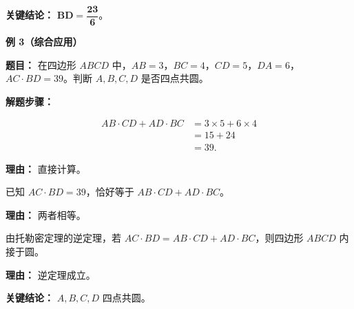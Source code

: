 \begin{examplebox}
	\textbf{\textcolor{CExample}{关键结论：}}
	$\mathbf{BD = \dfrac{23}{6}}$。

	\medskip
	\textbf{\textcolor{CExample}{例 3（综合应用）}}

	\textbf{\textcolor{CExample}{题目：}}
	在四边形 $ABCD$ 中，$AB=3$，$BC=4$，$CD=5$，$DA=6$，$AC\cdot BD = 39$。判断 $A,B,C,D$ 是否四点共圆。

	\textbf{\textcolor{CExample}{解题步骤：}}
	\begin{description}[style=nextline, leftmargin=2.8em, labelsep=0.5em, itemsep=0.45em]
		\item[\textbf{第一步（计算对边积和）：}]
			\[
				\begin{aligned}
					AB\cdot CD + AD\cdot BC &= 3\times5 + 6\times4 \\
					&= 15+24 \\
					&= 39.
			\end{aligned}
			\]
			\par\textbf{理由：} 直接计算。
		\item[\textbf{第二步（比较等式）：}] 已知 $AC\cdot BD=39$，恰好等于 $AB\cdot CD+AD\cdot BC$。
			\par\textbf{理由：} 两者相等。
		\item[\textbf{第三步（应用逆定理）：}] 由托勒密定理的逆定理，若 $AC\cdot BD = AB\cdot CD + AD\cdot BC$，则四边形 $ABCD$ 内接于圆。
			\par\textbf{理由：} 逆定理成立。
	\end{description}

	\textbf{\textcolor{CExample}{关键结论：}}
	$A,B,C,D$ 四点共圆。
\end{examplebox}
